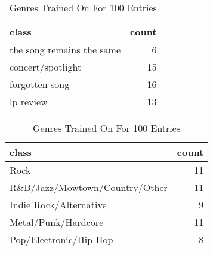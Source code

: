 \documentclass[letterpaper,10pt]{article}
\begin{document}
 \begin{table}[H]
\centering
\setlength\tabcolsep{4pt}
\begin{minipage}{0.48\textwidth}
\centering
\begin{tabular}{lr}
\hline
 class                     &   count \\
\hline
 the song remains the same &            6 \\
 concert/spotlight         &           15 \\
 forgotten song            &           16 \\
 lp review                 &           13 \\
\hline
\end{tabular}
\caption{Blog Structure Trained On For 100 Entries}
\label{tab:f50s} 
\end{minipage}%
\hfill
\begin{minipage}{0.48\textwidth}
\centering
\begin{tabular}{lr}
\hline
 class                          &   count \\
\hline
 Rock                           &           11 \\
 R\&B/Jazz/Mowtown/Country/Other &           11 \\
 Indie Rock/Alternative         &            9 \\
 Metal/Punk/Hardcore            &           11 \\
 Pop/Electronic/Hip-Hop         &            8 \\
\hline
\end{tabular}
 \caption{Genres Trained On For 100 Entries} 
 \label{tab:f50g} 
\end{minipage}
\end{table}
\end{document}
